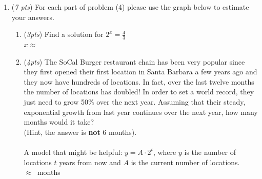 \documentclass[12pt]{article}
\newcommand{\ansbox}[2]{\raisebox{-.5\height}{\framebox(#1,#2){}}}
\begin{document}
\begin{enumerate}
\newpage
\item ({\it 7 pts}) For each part of problem (4) please use the graph below to estimate your answers. \\
\begin{enumerate} 
\item ({\it 3pts}) Find a solution for $2^x = \frac{4}{3}$\\
\phantom{.} \hfill$x \approx \ $ \ansbox{100}{90} 

\item ({\it 4pts}) The SoCal Burger restaurant chain has been very popular since they first opened their first location in Santa Barbara a few years ago and they now have hundreds of locations. In fact, over the last twelve months the number of locations has doubled! In order to set a world record, they just need to grow 50\% over the next year. Assuming that their steady, exponential growth from last year continues over the next year, how many months would it take? \\
(Hint, the answer is {\bf not} 6 months). \\ \\ 
A model that might be helpful: $y=A\cdot2^t$,
where $y$ is the number of locations $t$ years from now and $A$ is the current number of locations. \\
\vfill
\phantom{.} \hfill$\approx \ $ \ansbox{100}{70} months



\end{enumerate}
\end{enumerate}
\end{document}
